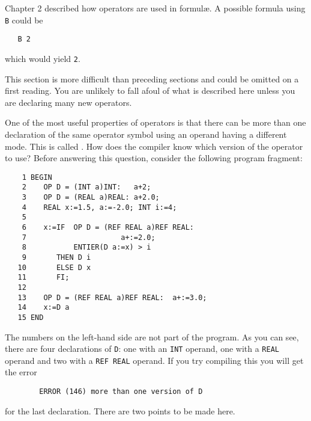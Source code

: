 Chapter 2 described how operators are used in formul\ae{}. A possible
formula using \verb|B| could be
\begin{verbatim}
   B 2
\end{verbatim}
\noindent
which would yield \verb|2|.

This section is more difficult than preceding sections and could be
omitted on a first reading. You are unlikely to fall afoul of what is
described here unless you are declaring many new operators.

One of the most useful properties of operators is that there can be
more than one declaration of the same operator symbol using an
operand having a different mode. This is called
.
How does the compiler know which version of the operator to use?
Before answering this question, consider the following program
fragment:
\begin{verbatim}
    1 BEGIN
    2    OP D = (INT a)INT:   a+2;
    3    OP D = (REAL a)REAL: a+2.0;
    4    REAL x:=1.5, a:=-2.0; INT i:=4;
    5
    6    x:=IF  OP D = (REF REAL a)REF REAL:
    7                      a+:=2.0;
    8           ENTIER(D a:=x) > i
    9       THEN D i
   10       ELSE D x
   11       FI;
   12
   13    OP D = (REF REAL a)REF REAL:  a+:=3.0;
   14    x:=D a
   15 END
\end{verbatim}
\noindent
The numbers on the left-hand side are not part of the program. As you
can see, there are four declarations of \verb|D|: one with an
\verb|INT| operand, one with a \verb|REAL| operand and two with a
\verb|REF REAL| operand. If you try compiling this you will get the
error
\begin{verbatim}
        ERROR (146) more than one version of D
\end{verbatim}
\noindent
for the last declaration. There are two points to be made here.
